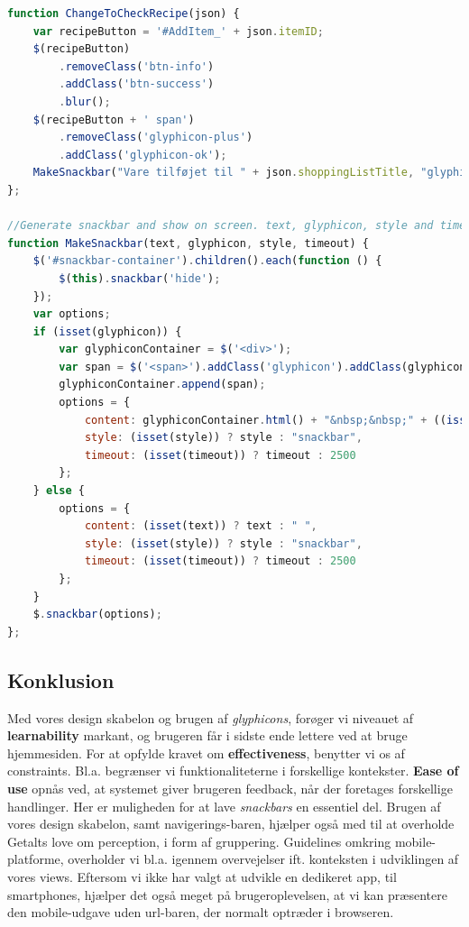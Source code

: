 \begin{lstlisting}[language=JavaScript,caption={Javascript funktioner, der giver bruger feedback},label=code:user_feedback]
function ChangeToCheckRecipe(json) {
    var recipeButton = '#AddItem_' + json.itemID;
    $(recipeButton)
        .removeClass('btn-info')
        .addClass('btn-success')
        .blur();
    $(recipeButton + ' span')
        .removeClass('glyphicon-plus')
        .addClass('glyphicon-ok');
    MakeSnackbar("Vare tilføjet til " + json.shoppingListTitle, "glyphicon-ok", "toast", "1500");
};

//Generate snackbar and show on screen. text, glyphicon, style and timeout is optional.
function MakeSnackbar(text, glyphicon, style, timeout) {
    $('#snackbar-container').children().each(function () {
        $(this).snackbar('hide');
    });
    var options;
    if (isset(glyphicon)) {
        var glyphiconContainer = $('<div>');
        var span = $('<span>').addClass('glyphicon').addClass(glyphicon);
        glyphiconContainer.append(span);
        options = {
            content: glyphiconContainer.html() + "&nbsp;&nbsp;" + ((isset(text)) ? text : " "),
            style: (isset(style)) ? style : "snackbar",
            timeout: (isset(timeout)) ? timeout : 2500
        };
    } else {
        options = {
            content: (isset(text)) ? text : " ",
            style: (isset(style)) ? style : "snackbar",
            timeout: (isset(timeout)) ? timeout : 2500
        };
    }
    $.snackbar(options);
};
\end{lstlisting}

\subsection{Konklusion}
Med vores design skabelon og brugen af \textit{glyphicons}, forøger vi niveauet af \textbf{learnability} markant, og brugeren får i sidste ende lettere ved at bruge hjemmesiden.
For at opfylde kravet om \textbf{effectiveness}, benytter vi os af constraints.
Bl.a. begrænser vi funktionaliteterne i forskellige kontekster.
\textbf{Ease of use} opnås ved, at systemet giver brugeren feedback, når der foretages forskellige handlinger.
Her er muligheden for at lave \textit{snackbars} en essentiel del.
Brugen af vores design skabelon, samt navigerings-baren, hjælper også med til at overholde Getalts love om perception, i form af gruppering.
Guidelines omkring mobile-platforme, overholder vi bl.a. igennem overvejelser ift. konteksten i udviklingen af vores views.
Eftersom vi ikke har valgt at udvikle en dedikeret app, til smartphones, hjælper det også meget på brugeroplevelsen, at vi kan præsentere den mobile-udgave uden url-baren, der normalt optræder i browseren.
